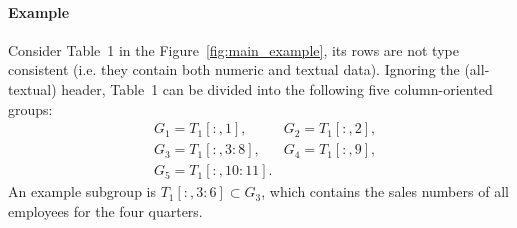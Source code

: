 \documentclass{ecai}
\newcommand{\range}[3]{\ensuremath{#1[#2,#3]}}
\newcommand{\rangeto}[2]{#1{:}#2}
\newcommand{\rangeall}{:}
\begin{document}

\paragraph{Example}
Consider Table~1 in the Figure~\ref{fig:main_example}, its rows are not type consistent (i.e. they contain both numeric and textual data).
Ignoring the (all-textual) header, Table~1 can be divided into the following five column-oriented groups:
{\small
\begin{align*}
&G_1 = \range{T_1}{\rangeall}{1},
&G_2 = \range{T_1}{\rangeall}{2},\\
&G_3 = \range{T_1}{\rangeall}{\rangeto{3}{8}},
&G_4 = \range{T_1}{\rangeall}{9},\\
&G_5 = \range{T_1}{\rangeall}{\rangeto{10}{11}}.
\end{align*}
}
An example subgroup is $\range{T_1}{\rangeall}{\rangeto{3}{6}} \subset G_3$, which contains the sales numbers of all employees for the four quarters.
\end{document}
